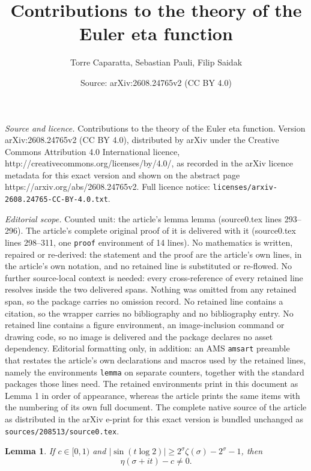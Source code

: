 \documentclass[10pt,a4paper]{amsart}
\title{Contributions to the theory of the Euler eta function}
\author{Torre Caparatta, Sebastian Pauli, Filip Saidak}
\date{Source: arXiv:2608.24765v2 (CC BY 4.0)}
\newtheorem{lemma}{Lemma}
\begin{document}
\maketitle

\noindent\emph{Source and licence.} Contributions to the theory of the Euler eta function. Version arXiv:2608.24765v2 (CC BY 4.0), distributed by arXiv under the Creative Commons Attribution 4.0 International licence, http://creativecommons.org/licenses/by/4.0/, as recorded in the arXiv licence metadata for this exact version and shown on the abstract page https://arxiv.org/abs/2608.24765v2. Full licence notice: \texttt{licenses/arxiv-2608.24765-CC-BY-4.0.txt}.\par\smallskip

\noindent\textit{Editorial scope.} Counted unit: the article's lemma lemma (source0.tex lines 293--296). The article's complete original proof of it is delivered with it (source0.tex lines 298--311, one \texttt{proof} environment of 14 lines). No mathematics is written, repaired or re-derived: the statement and the proof are the article's own lines, in the article's own notation, and no retained line is substituted or re-flowed.  No further source-local context is needed: every cross-reference of every retained line resolves inside the two delivered spans.  Nothing was omitted from any retained span, so the package carries no omission record.  No retained line contains a citation, so the wrapper carries no bibliography and no bibliography entry.  No retained line contains a figure environment, an image-inclusion command or drawing code, so no image is delivered and the package declares no asset dependency.  Editorial formatting only, in addition: an AMS \texttt{amsart} preamble that restates the article's own declarations and macros used by the retained lines, namely the environments \texttt{lemma} on separate counters, together with the standard packages those lines need.  The retained environments print in this document as Lemma 1 in order of appearance, whereas the article prints the same items with the numbering of its own full document.  The complete native source of the article as distributed in the arXiv e-print for this exact version is bundled unchanged as \texttt{sources/208513/source0.tex}.
\begin{lemma}
    If $c\in[0,1)$ and $|\sin(t\log 2)|\geq 2^\sigma \zeta(\sigma)-2^\sigma - 1$, then 
    $$\eta(\sigma +it)-c \ne 0. $$
\end{lemma}
\end{document}
